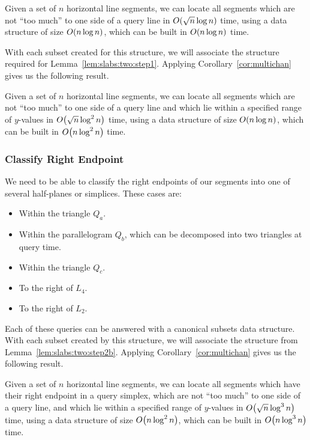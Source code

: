 \begin{lemma}
\label{lem:slabs:two:step2a}
Given a set of $n$ horizontal line segments, we can locate all segments which are not ``too much'' to one side of a query line in $O\!\left(\sqrt{n}\log{n}\right)$ time, using a data structure of size $O\!\left(n\log{n}\right)$, which can be built in $O\!\left(n\log{n}\right)$ time.
\end{lemma}

With each subset created for this structure, we will associate the structure required for Lemma~\ref{lem:slabs:two:step1}.
Applying Corollary~\ref{cor:multichan} gives us the following result.

\begin{lemma}
\label{lem:slabs:two:step2b}
Given a set of $n$ horizontal line segments, we can locate all segments which are not ``too much'' to one side of a query line and which lie within a specified range of $y$-values in $O\!\left(\sqrt{n}\log^2{n}\right)$ time, using a data structure of size $O\!\left(n\log{n}\right)$, which can be built in $O\!\left(n\log^2{n}\right)$ time.
\end{lemma}


\subsubsection{Classify Right Endpoint}

We need to be able to classify the right endpoints of our segments into one of several half-planes or simplices. These cases are:
\begin{itemize}
 \item Within the triangle $Q_a$.
 \item Within the parallelogram $Q_b$, which can be decomposed into two triangles at query time.
 \item Within the triangle $Q_c$.
 \item To the right of $L_4$.
 \item To the right of $L_2$.
\end{itemize}

Each of these queries can be answered with a canonical subsets data structure. 
With each subset created by this structure, we will associate the structure from Lemma~\ref{lem:slabs:two:step2b}. 
Applying Corollary~\ref{cor:multichan} gives us the following result.

\begin{lemma}
\label{lem:slabs:two:step3}
Given a set of $n$ horizontal line segments, we can locate all segments which have their right endpoint in a query simplex, which are not ``too much'' to one side of a query line, and which lie within a specified range of $y$-values in $O\!\left(\sqrt{n}\log^3{n}\right)$ time, using a data structure of size $O\!\left(n\log^2{n}\right)$, which can be built in $O\!\left(n\log^3{n}\right)$ time.
\end{lemma}


